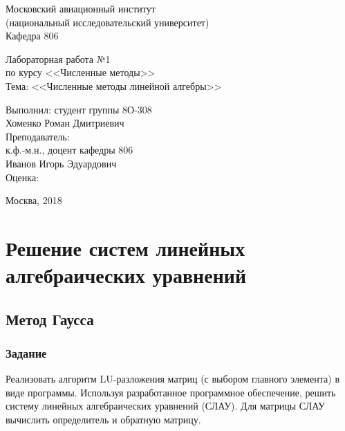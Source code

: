\documentclass[a4paper,12pt]{article}
\begin{document}
\begin{titlepage}
\begin{center}
    {Московский авиационный институт} \\
    {(национальный исследовательский университет)} \\
    {Кафедра 806}

\vspace{8cm}
\large{
    {Лабораторная работа №1} \\
    {по курсу <<Численные методы>>} \\
    {Тема: <<Численные методы линейной алгебры>>}
}
\end{center}

\vspace{6cm}
\begin{flushright}
\begin{minipage}{0.4\textwidth}
    \begin{flushleft}
        {Выполнил: студент группы 8О-308} \\
        {Хоменко Роман Дмитриевич} \\
        \vspace{0.5cm}
        {Преподаватель:} \\
        {к.ф.-м.н., доцент кафедры 806} \\
        {Иванов Игорь Эдуардович} \\
        \vspace{0.5cm}
        Оценка:
    \end{flushleft}
\end{minipage}
\end{flushright}

\vfill
\begin{center}
    {Москва, 2018}
\end{center}

\end{titlepage}

\section{Решение систем линейных алгебраических уравнений}

\subsection{Метод Гаусса}
\subsubsection{Задание}
Реализовать алгоритм LU-разложения матриц (с выбором главного элемента)
в виде программы. Используя разработанное программное обеспечение,
решить систему линейных алгебраических уравнений (СЛАУ). Для матрицы СЛАУ вычислить
определитель и обратную матрицу.
\end{document}
